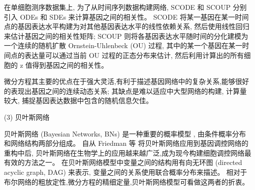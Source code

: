 在单细胞测序数据集上, 
为了从时间序列数据构建网络, SCODE \cite{matsumoto2017scode} 和 SCOUP \cite{matsumoto2016scoup} 
分别引入 ODEs 和 SDEs 来计算基因之间的相关性。
SCODE 将某一基因在某一时间点的基因表达水平构建为对其他基因表达水平的线性依赖关系,
然后使用线性回归来估计基因之间的相关性矩阵;
SCOUP 则将各基因表达水平随时间的分化建模为一个连续的随机扩散 Ornstein-Uhlenbeck (OU) 过程,
其中的某一个基因在某一时间点的表达量可以通过当前 OU 过程的正态分布来估计,
然后利用计算出的所有细胞的 z 值得到基因之间的相关性。

微分方程其主要的优点在于强大灵活,有利于描述基因网络中的复杂关系,能够很好的表现出基因之间的连续动态关系;
其缺点是难以适应中大型网络的构建, 计算量较大, 捕捉基因表达数据中包含的随机信息欠佳。

(3) 贝叶斯网络

贝叶斯网络 (Bayesian Networks, BNs) 是一种重要的概率模型 \cite{kim2003inferring,zou2004new,chen2006effective,needham2007primer,lo2015high},
由条件概率分布和网络结构两部分组成。
自从 Friedman 等 \cite{friedman2000using} 将贝叶斯网络应用到基因调控网络的重构中后,
贝叶斯网络在生物学上的应用越来越广泛,成为现今构建细胞调控网络最有效的方法之一。
在贝叶斯网络模型中变量之间的结构用有向无环图 (directed acyclic graph, DAG) 来表示,
变量之间的关系使用联合概率分布来描述。
相对于布尔网络的粗放定性,微分方程的精细定量,贝叶斯网络模型可看做这两者的折衷。

